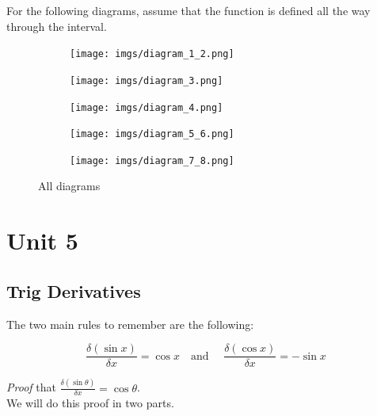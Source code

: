 \documentclass{article}
\begin{document}
For the following diagrams, assume that the function is defined all the way through the interval.
\begin{figure}[ht]
    \centering
    \begin{subfigure}[b]{0.9\textwidth}
        \centering
        \texttt{[image: imgs/diagram\_1\_2.png]}
        \caption{}
    \end{subfigure}
    
    \begin{subfigure}[b]{0.45\textwidth}
        \centering
        \texttt{[image: imgs/diagram\_3.png]}
        \caption{}
    \end{subfigure}
    \hfill
    \begin{subfigure}[b]{0.45\textwidth}
        \centering
        \texttt{[image: imgs/diagram\_4.png]}
        \caption{}
    \end{subfigure}
    
    \begin{subfigure}[b]{0.9\textwidth}
        \centering
        \texttt{[image: imgs/diagram\_5\_6.png]}
        \caption{}
    \end{subfigure}
    
    \begin{subfigure}[b]{0.9\textwidth}
        \centering
        \texttt{[image: imgs/diagram\_7\_8.png]}
        \caption{}
    \end{subfigure}
    
    \caption{All diagrams}
\end{figure}

\clearpage %

\section{Unit 5}
\subsection{Trig Derivatives}
The two main rules to remember are the following:
\begin{tcolorbox}[sharp corners=uphill,
    colback=purple!50!white,colframe=blue!25!black,coltext=yellow,
    fontupper=\Large\bfseries,arc=6mm,boxrule=2mm,boxsep=5mm]
    $$\frac{\delta (\sin x)}{\delta x}=\cos x \quad \text{and } \quad \frac{\delta(\cos x)}{\delta x}=-\sin x$$
\end{tcolorbox}

\textit{Proof} that $\frac{\delta (\sin \theta)}{\delta x}=\cos \theta$.\\
We will do this proof in two parts. 
\end{document}
